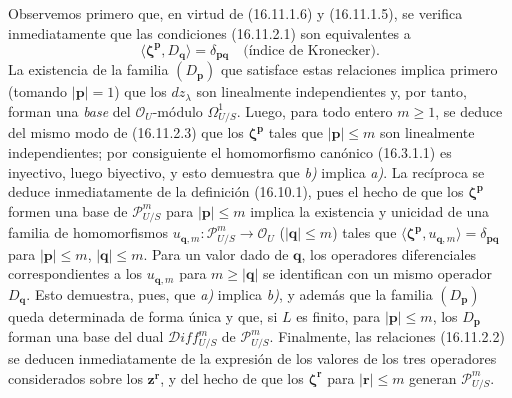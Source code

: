 Observemos primero que, en virtud de (16.11.1.6) y (16.11.1.5), se verifica
inmediatamente que las condiciones (16.11.2.1) son equivalentes a
\[
  \langle\boldsymbol{\zeta}^{\mathbf{p}},D_{\mathbf{q}}\rangle
  =\delta_{\mathbf{p}\mathbf{q}}
  \quad\text{(índice de Kronecker)}.
  \tag{16.11.2.3}
  \label{IV.16.11.2.3}
\]
La existencia de la familia $(D_{\mathbf{p}})$ que satisface estas relaciones
implica primero (tomando $|\mathbf{p}|=1$) que los $dz_\lambda$ son
linealmente independientes y, por tanto, forman una \emph{base} del
$\mathcal{O}_U$-módulo $\varOmega_{U/S}^1$. Luego, para todo entero $m\geq1$, se
deduce del mismo modo de (16.11.2.3) que los $\boldsymbol{\zeta}^{\mathbf{p}}$
tales que $|\mathbf{p}|\leq m$ son linealmente independientes; por consiguiente
el homomorfismo canónico (16.3.1.1) es inyectivo, luego biyectivo, y esto
demuestra que \emph{b)} implica \emph{a)}. La recíproca se deduce inmediatamente de la
definición (16.10.1), pues el hecho de que los $\boldsymbol{\zeta}^{\mathbf{p}}$
formen una base de $\mathscr{P}_{U/S}^m$ para $|\mathbf{p}|\leq m$ implica la
existencia y unicidad de una familia de homomorfismos
$u_{\mathbf{q},m}:\mathscr{P}_{U/S}^m\to\mathcal{O}_U$
($|\mathbf{q}|\leq m$) tales que
$\langle\boldsymbol{\zeta}^{\mathbf{p}},u_{\mathbf{q},m}\rangle
=\delta_{\mathbf{p}\mathbf{q}}$ para $|\mathbf{p}|\leq m$,
$|\mathbf{q}|\leq m$. Para un valor dado de $\mathbf{q}$, los operadores
diferenciales correspondientes a los $u_{\mathbf{q},m}$ para
$m\geq|\mathbf{q}|$ se identifican con un mismo operador $D_{\mathbf{q}}$.
Esto demuestra, pues, que \emph{a)} implica \emph{b)}, y además que la familia
$(D_{\mathbf{p}})$ queda determinada de forma única y que, si $L$ es finito,
para $|\mathbf{p}|\leq m$, los $D_{\mathbf{p}}$ forman una base del dual
$\mathscr D\!iff_{U/S}^m$ de $\mathscr{P}_{U/S}^m$. Finalmente, las relaciones
(16.11.2.2) se deducen inmediatamente de la expresión de los valores de los tres
operadores considerados sobre los $\mathbf{z}^{\mathbf{r}}$, y del hecho de que
los $\boldsymbol{\zeta}^{\mathbf{r}}$ para $|\mathbf{r}|\leq m$ generan
$\mathscr{P}_{U/S}^m$.


